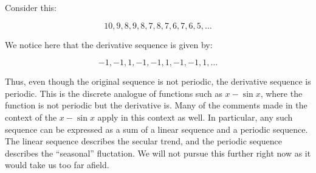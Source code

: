 \documentclass{amsart}
\begin{document}
Consider this:

$$10,9,8,9,8,7,8,7,6,7,6,5,\dots$$

We notice here that the derivative sequence is given by:

$$-1,-1,1,-1,-1,1,-1,-1,1,\dots$$

Thus, even though the original sequence is not periodic, the
derivative sequence is periodic. This is the discrete analogue of
functions such as $x - \sin x$, where the function is not periodic but
the derivative is. Many of the comments made in the context of the $x
- \sin x$ apply in this context as well. In particular, any such
sequence can be expressed as a sum of a linear sequence and a periodic
sequence. The linear sequence describes the secular trend, and the
periodic sequence describes the ``seasonal'' fluctation. We will not
pursue this further right now as it would take us too far afield.
\end{document}
